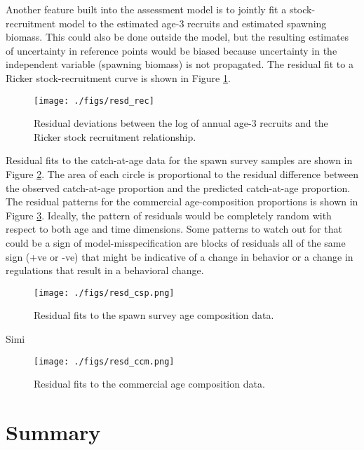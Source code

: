 \documentclass[12pt,letterpaper]{article}
\begin{document}
  Another feature built into the assessment model is to jointly fit a stock-recruitment model to the estimated age-3 recruits and estimated spawning biomass.  This could also be done outside the model, but the resulting estimates of uncertainty in reference points would be biased because uncertainty in the independent variable (spawning biomass) is not propagated. The residual fit to a Ricker stock-recruitment curve is shown in Figure \ref{fig:resd_rec}.


  \begin{figure}[tb]
    \centering
    \texttt{[image: ./figs/resd\_rec]}
    \caption{Residual deviations between the log of annual age-3 recruits and the Ricker stock recruitment relationship.}
    \label{fig:resd_rec}
  \end{figure}

  Residual fits to the catch-at-age data for the spawn survey samples are shown in Figure \ref{fig:resd_csp}.  The area of each circle is proportional to the residual difference between the observed catch-at-age proportion and the predicted catch-at-age proportion. The residual patterns for the commercial age-composition proportions is shown in Figure \ref{fig:resd_ccm}. Ideally, the pattern of residuals would be completely random with respect to both age and time dimensions.  Some patterns to watch out for that could be a sign of model-misspecification are blocks of residuals all of the same sign (+ve or -ve) that might be indicative of a change in behavior or a change in regulations that result in a behavioral change.

  \begin{figure}[tb]
    \centering
    \texttt{[image: ./figs/resd\_csp.png]}
    \caption{Residual fits to the spawn survey age composition data.}
    \label{fig:resd_csp}
  \end{figure}

  Simi

  \begin{figure}[tb]
    \centering
    \texttt{[image: ./figs/resd\_ccm.png]}
    \caption{Residual fits to the commercial age composition data.}
    \label{fig:resd_ccm}
  \end{figure}

  
  \clearpage


  \section{Summary} %
\end{document}
